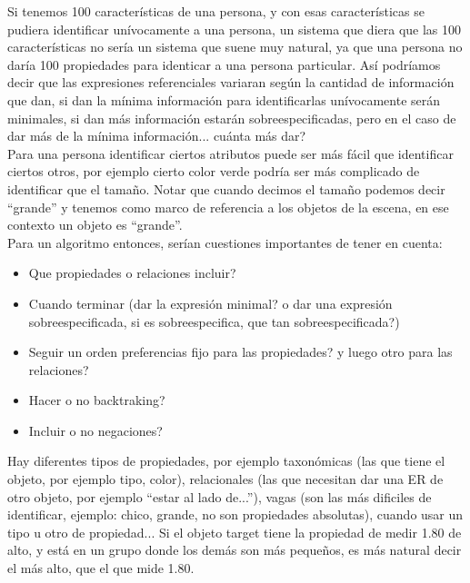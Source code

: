 Si tenemos 100 caracter\'isticas de una persona, y con esas caracter\'isticas se pudiera identificar un\'ivocamente a una persona, un sistema que diera que las 100 caracter\'isticas no ser\'ia un sistema que suene muy natural, ya que una persona no dar\'ia 100 propiedades para identicar a una persona particular. As\'i podr\'iamos decir que las expresiones referenciales variaran seg\'un la cantidad de informaci\'on que dan, si dan la m\'inima informaci\'on para identificarlas un\'ivocamente ser\'an minimales, si dan m\'as informaci\'on estar\'an sobreespecificadas, pero en el caso de dar m\'as de la m\'inima informaci\'on... cu\'anta m\'as dar?\\


Para una persona identificar ciertos atributos puede ser m\'as f\'acil que identificar ciertos otros, por ejemplo cierto color verde podr\'{i}a ser m\'as complicado de identificar que el tama\~no. Notar que cuando decimos el tama\~no podemos decir ``grande'' y tenemos como marco de referencia a los objetos de la escena, en ese contexto un objeto es ``grande''.\\

Para un algoritmo entonces, ser\'ian cuestiones importantes de tener en cuenta:

\begin{itemize}
 \item Que propiedades o relaciones incluir?
 \item Cuando terminar (dar la expresi\'on minimal? o dar una expresi\'on sobreespecificada, si es sobreespecifica, que tan sobreespecificada?)
 \item Seguir un orden preferencias fijo para las propiedades? y luego otro para las relaciones?
 \item Hacer o no backtraking?
 \item Incluir o no negaciones?
\end{itemize}


Hay diferentes tipos de propiedades, por ejemplo taxon\'omicas (las que tiene el objeto, por ejemplo tipo, color), relacionales (las que necesitan dar una ER de otro objeto, por ejemplo ``estar al lado de...''), vagas (son las m\'as dificiles de identificar, ejemplo: chico, grande, no son propiedades absolutas), cuando usar un tipo u otro de propiedad... 
Si el objeto target tiene la propiedad de medir 1.80 de alto, y est\'a en un grupo donde los dem\'as son m\'as peque\~nos, es m\'as natural decir el m\'as alto, que el que mide 1.80.\\


